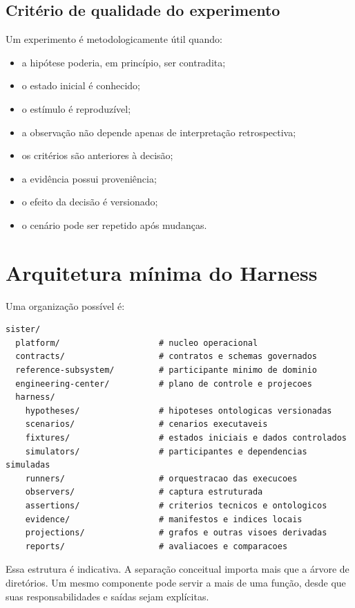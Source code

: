 \documentclass[11pt,a4paper,oneside]{article}
\begin{document}
\subsection{Critério de qualidade do experimento}

Um experimento é metodologicamente útil quando:

\begin{itemize}
  \item a hipótese poderia, em princípio, ser contradita;
  \item o estado inicial é conhecido;
  \item o estímulo é reproduzível;
  \item a observação não depende apenas de interpretação retrospectiva;
  \item os critérios são anteriores à decisão;
  \item a evidência possui proveniência;
  \item o efeito da decisão é versionado;
  \item o cenário pode ser repetido após mudanças.
\end{itemize}

\section{Arquitetura mínima do Harness}

Uma organização possível é:

\begin{lstlisting}
sister/
  platform/                    # nucleo operacional
  contracts/                   # contratos e schemas governados
  reference-subsystem/         # participante minimo de dominio
  engineering-center/          # plano de controle e projecoes
  harness/
    hypotheses/                # hipoteses ontologicas versionadas
    scenarios/                 # cenarios executaveis
    fixtures/                  # estados iniciais e dados controlados
    simulators/                # participantes e dependencias simuladas
    runners/                   # orquestracao das execucoes
    observers/                 # captura estruturada
    assertions/                # criterios tecnicos e ontologicos
    evidence/                  # manifestos e indices locais
    projections/               # grafos e outras visoes derivadas
    reports/                   # avaliacoes e comparacoes
\end{lstlisting}

Essa estrutura é indicativa. A separação conceitual importa mais que a árvore de diretórios. Um mesmo componente pode servir a mais de uma função, desde que suas responsabilidades e saídas sejam explícitas.
\end{document}
